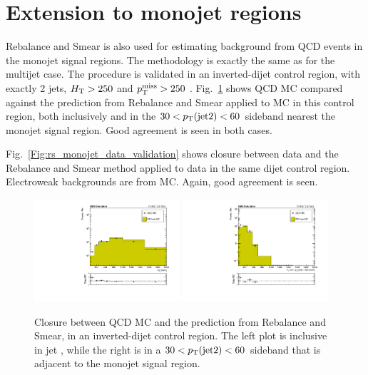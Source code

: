 \section{Extension to monojet regions}

Rebalance and Smear is also used for estimating background from QCD events in the monojet signal regions.
The methodology is exactly the same as for the multijet case. The procedure is validated in an inverted-\dphimet dijet
control region, with exactly 2 jets, $H_{\mathrm{T}}>250$ \GeV and $p_{\mathrm{T}}^{\mathrm{miss}}>250$ \GeV. Fig.~\ref{Fig:rs_monojet_mc_validation} shows QCD MC
compared against the prediction from Rebalance and Smear applied to MC in this control region,
both inclusively and in the $30 < p_{\mathrm{T}}(\mathrm{jet 2}) < 60$ \GeV
sideband nearest the monojet signal region. Good agreement is seen in both cases.

Fig.~\ref{Fig:rs_monojet_data_validation} shows closure between data and the Rebalance and Smear method applied to data
in the same dijet control region. Electroweak backgrounds are from MC. Again, good agreement is seen.

\begin{figure}[htbp]
  \begin{center}
    \includegraphics[width=0.48\textwidth]{figs/qcd/rs_data/monojet/mc_crRSInvertDPhibaseJ_htbins.pdf}
    \includegraphics[width=0.48\textwidth]{figs/qcd/rs_data/monojet/mc_crRSInvertDPhibaseJ_htbins_jet2pt_30_60.pdf}
    \caption{Closure between QCD MC and the prediction from Rebalance and Smear, in an inverted-\dphimet dijet
control region. The left plot is inclusive in jet \pt, while the right is in a $30 < p_{\mathrm{T}}(\mathrm{jet 2}) < 60$ \GeV
sideband that is adjacent to the monojet signal region.
            }
    \label{Fig:rs_monojet_mc_validation}
  \end{center}
\end{figure}

